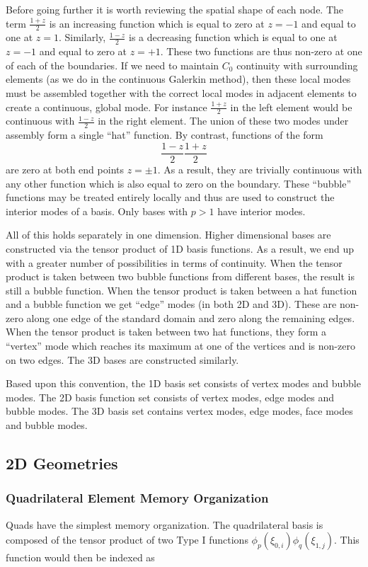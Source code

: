 Before going further it is worth reviewing the spatial shape of each node. The term $\frac{1 + z}{2}$ is an increasing function which is equal to zero at $z = -1$ and equal to one at $z = 1$. Similarly, $\frac{1 - z}{2}$ is a decreasing function which is equal to one at $z = -1$ and equal to zero at $z = +1$. These two functions are thus non-zero at one of each of the boundaries. If we need to maintain $C_0$ continuity with surrounding elements (as we do in the continuous Galerkin method), then these local modes must be assembled together with the correct local modes in adjacent elements to create a continuous, global mode. For instance $\frac{1 + z}{2}$ in the left element would be continuous with $\frac{1 - z}{2}$ in the right element. The union of these two modes under assembly form a single ``hat'' function. By contrast, functions of the form
\[
    \frac{1 - z}{2} \frac{1 + z}{2}
\]
are zero at both end points $z = \pm 1$. As a result, they are trivially continuous with any other function which is also equal to zero on the boundary. These ``bubble'' functions may be treated entirely locally and thus are used to construct the interior modes of a basis. Only bases with $p > 1$ have interior modes.

All of this holds separately in one dimension. Higher dimensional bases are constructed via the tensor product of 1D basis functions. As a result, we end up with a greater number of possibilities in terms of continuity. When the tensor product is taken between two bubble functions from different bases, the result is still a bubble function. When the tensor product is taken between a hat function and a bubble function we get ``edge'' modes (in both 2D and 3D). These are non-zero along one edge of the standard domain and zero along the remaining edges. When the tensor product is taken between two hat functions, they form a ``vertex'' mode which reaches its maximum at one of the vertices and is non-zero on two edges.  The 3D bases are constructed similarly.

Based upon this convention, the 1D basis set consists of vertex modes and bubble modes.  The 2D basis function set consists of vertex modes, edge modes and bubble modes.  The 3D basis set contains vertex modes, edge modes, face modes and bubble modes.

\subsection{2D Geometries}

\subsubsection{Quadrilateral Element Memory Organization}
Quads have the simplest memory organization. The quadrilateral basis is composed of the tensor product of two Type I functions $\phi_p(\xi_{0,i}) \phi_q(\xi_{1,j})$. This function would then be indexed as

